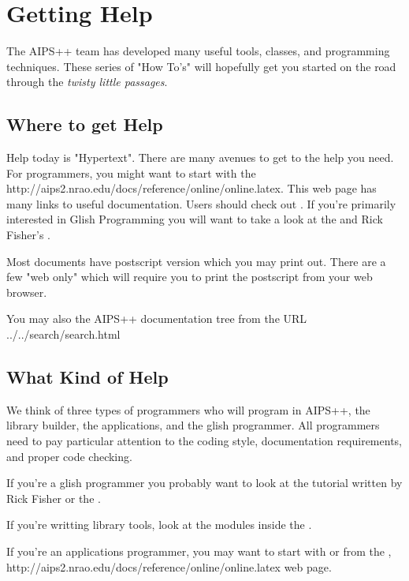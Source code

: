 \chapter{Getting Help}

The AIPS++ team has developed many useful tools, classes, and programming
techniques.  These series of "How To's"
will hopefully get you started on the road through the \textit{twisty little
passages}. 

\section{Where to get Help}
Help today is "Hypertext". There are many avenues to get to the help
you need.  For programmers, you might want to start with the 
http://aips2.nrao.edu/docs/reference/online/online.latex.
This web page has many links to useful documentation. Users should check
out \textbf{}.  If you're primarily interested in
Glish Programming you will want to take a look at the \textbf{} and Rick Fisher's \textbf{}.

Most documents have postscript version which you may print out.  There are
a few "web only" which will require you to print the postscript from your
web browser.  

You may also  the
AIPS++ documentation tree from the URL 
{../../search/search.html}
\section{What Kind of Help}
We think of three types of programmers who will program in AIPS++,
the library builder, the applications, and the glish programmer.
All programmers need to pay particular attention to the coding
style, documentation requirements, and proper code checking.

If you're a glish programmer you probably want to look at the 
tutorial written by Rick Fisher or the \textbf{}.

If you're writting library tools, look at the modules inside the
.

If you're an applications programmer, you may want to start with
\textbf{}
or from the 
,
http://aips2.nrao.edu/docs/reference/online/online.latex web page.
